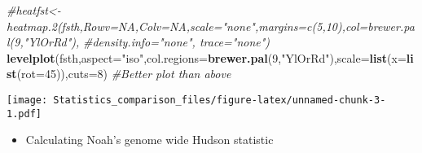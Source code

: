 \documentclass[]{article}
\newenvironment{Shaded}{\begin{snugshade}}{\end{snugshade}}
\newcommand{\KeywordTok}[1]{\textcolor[rgb]{0.13,0.29,0.53}{\textbf{#1}}}
\newcommand{\DataTypeTok}[1]{\textcolor[rgb]{0.13,0.29,0.53}{#1}}
\newcommand{\DecValTok}[1]{\textcolor[rgb]{0.00,0.00,0.81}{#1}}
\newcommand{\StringTok}[1]{\textcolor[rgb]{0.31,0.60,0.02}{#1}}
\newcommand{\CommentTok}[1]{\textcolor[rgb]{0.56,0.35,0.01}{\textit{#1}}}
\newcommand{\NormalTok}[1]{#1}
\providecommand{\tightlist}{%
  \setlength{\itemsep}{0pt}\setlength{\parskip}{0pt}}
\begin{document}
\begin{Shaded}
\begin{Highlighting}[]
\CommentTok{#heatfst<-heatmap.2(fsth,Rowv=NA,Colv=NA,scale="none",margins=c(5,10),col=brewer.pal(9,"YlOrRd"),}
                   \CommentTok{#density.info="none", trace="none")}
\KeywordTok{levelplot}\NormalTok{(fsth,}\DataTypeTok{aspect=}\StringTok{"iso"}\NormalTok{,}\DataTypeTok{col.regions=}\KeywordTok{brewer.pal}\NormalTok{(}\DecValTok{9}\NormalTok{,}\StringTok{"YlOrRd"}\NormalTok{),}\DataTypeTok{scale=}\KeywordTok{list}\NormalTok{(}\DataTypeTok{x=}\KeywordTok{list}\NormalTok{(}\DataTypeTok{rot=}\DecValTok{45}\NormalTok{)),}\DataTypeTok{cuts=}\DecValTok{8}\NormalTok{) }\CommentTok{#Better plot than above}
\end{Highlighting}
\end{Shaded}

\texttt{[image: Statistics\_comparison\_files/figure-latex/unnamed-chunk-3-1.pdf]}

\begin{itemize}
\tightlist
\item
  Calculating Noah's genome wide Hudson statistic
\end{itemize}
\end{document}
